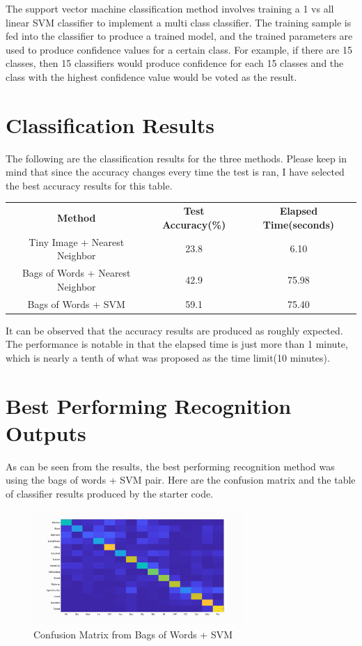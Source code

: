 The support vector machine classification method involves training a 1 vs all linear SVM classifier to implement a multi class classifier. The training sample is fed into the classifier to produce a trained model, and the trained parameters are used to produce confidence values for a certain class. For example, if there are 15 classes, then 15 classifiers would produce confidence for each 15 classes and the class with the highest confidence value would be voted as the result.

\pagebreak

\section*{Classification Results} The following are the classification results for the three methods. Please keep in mind that since the accuracy changes every time the test is ran, I have selected the best accuracy results for this table.
\begin{center}
\begin{tabular}{ c c c }
    \textbf{Method} & \textbf{Test Accuracy(\%)} & \textbf{Elapsed Time(seconds)}  \\
    Tiny Image + Nearest Neighbor & 23.8 & 6.10  \\
    Bags of Words + Nearest Neighbor & 42.9 & 75.98 \\
    Bags of Words + SVM & 59.1 & 75.40
\end{tabular}
\end{center}
It can be observed that the accuracy results are produced as roughly expected. The performance is notable in that the elapsed time is just more than 1 minute, which is nearly a tenth of what was proposed as the time limit(10 minutes).

\pagebreak

\section*{Best Performing Recognition Outputs}
As can be seen from the results, the best performing recognition method was using the bags of words + SVM pair. Here are the confusion matrix and the table of classifier results produced by the starter code.

\begin{figure}[h!]
    \centering
    \captionsetup{justification=centering}
    \includegraphics[width=8cm]{confusion_matrix.png}
    \caption{Confusion Matrix from Bags of Words + SVM}
\end{figure}

